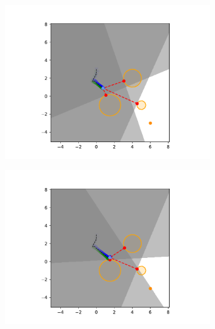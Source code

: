 \begin{figure}[h]
\begin{subfigure}{0.20\textwidth}
        \includegraphics[width=\textwidth]{figures/Simulations/sim1circles/frame_2.pdf}
    \end{subfigure}%
    \hfill
    \begin{subfigure}{0.20\textwidth}
        \centering
        \includegraphics[width=\textwidth]{figures/Simulations/sim1circles/frame_3.pdf}
    \end{subfigure}%
    \hfill
    \begin{subfigure}{0.20\textwidth}
        \centering

\end{subfigure}
\end{figure}
